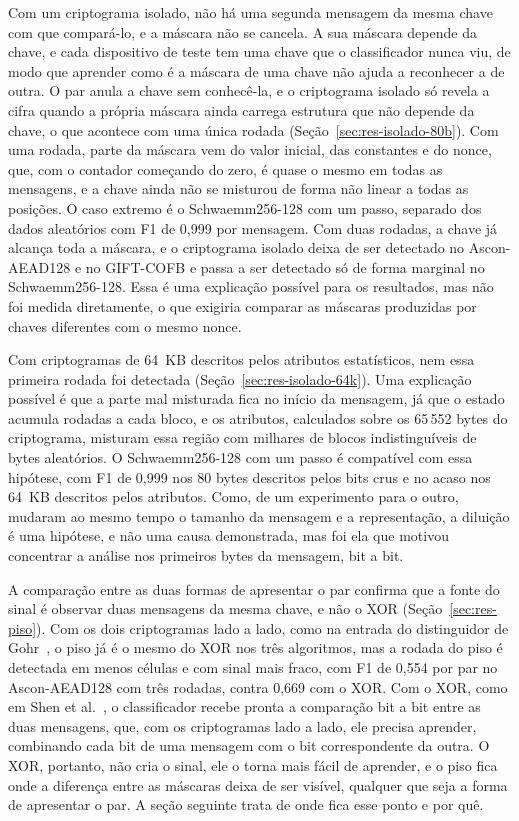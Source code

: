 Com um criptograma isolado, não há uma segunda mensagem da mesma chave com que compará-lo, e a máscara não se cancela. A sua máscara depende da chave, e cada dispositivo de teste tem uma chave que o classificador nunca viu, de modo que aprender como é a máscara de uma chave não ajuda a reconhecer a de outra. O par anula a chave sem conhecê-la, e o criptograma isolado só revela a cifra quando a própria máscara ainda carrega estrutura que não depende da chave, o que acontece com uma única rodada (Seção~\ref{sec:res-isolado-80b}). Com uma rodada, parte da máscara vem do valor inicial, das constantes e do nonce, que, com o contador começando do zero, é quase o mesmo em todas as mensagens, e a chave ainda não se misturou de forma não linear a todas as posições. O caso extremo é o Schwaemm256-128 com um passo, separado dos dados aleatórios com F1 de 0,999 por mensagem. Com duas rodadas, a chave já alcança toda a máscara, e o criptograma isolado deixa de ser detectado no Ascon-AEAD128 e no GIFT-COFB e passa a ser detectado só de forma marginal no Schwaemm256-128. Essa é uma explicação possível para os resultados, mas não foi medida diretamente, o que exigiria comparar as máscaras produzidas por chaves diferentes com o mesmo nonce.

Com criptogramas de 64~KB descritos pelos atributos estatísticos, nem essa primeira rodada foi detectada (Seção~\ref{sec:res-isolado-64k}). Uma explicação possível é que a parte mal misturada fica no início da mensagem, já que o estado acumula rodadas a cada bloco, e os atributos, calculados sobre os 65\,552 bytes do criptograma, misturam essa região com milhares de blocos indistinguíveis de bytes aleatórios. O Schwaemm256-128 com um passo é compatível com essa hipótese, com F1 de 0,999 nos 80 bytes descritos pelos bits crus e no acaso nos 64~KB descritos pelos atributos. Como, de um experimento para o outro, mudaram ao mesmo tempo o tamanho da mensagem e a representação, a diluição é uma hipótese, e não uma causa demonstrada, mas foi ela que motivou concentrar a análise nos primeiros bytes da mensagem, bit a bit.

A comparação entre as duas formas de apresentar o par confirma que a fonte do sinal é observar duas mensagens da mesma chave, e não o XOR (Seção~\ref{sec:res-piso}). Com os dois criptogramas lado a lado, como na entrada do distinguidor de Gohr~\cite{gohr_2019}, o piso já é o mesmo do XOR nos três algoritmos, mas a rodada do piso é detectada em menos células e com sinal mais fraco, com F1 de 0,554 por par no Ascon-AEAD128 com três rodadas, contra 0,669 com o XOR. Com o XOR, como em Shen et al.~\cite{Shen2024ND}, o classificador recebe pronta a comparação bit a bit entre as duas mensagens, que, com os criptogramas lado a lado, ele precisa aprender, combinando cada bit de uma mensagem com o bit correspondente da outra. O XOR, portanto, não cria o sinal, ele o torna mais fácil de aprender, e o piso fica onde a diferença entre as máscaras deixa de ser visível, qualquer que seja a forma de apresentar o par. A seção seguinte trata de onde fica esse ponto e por quê.


